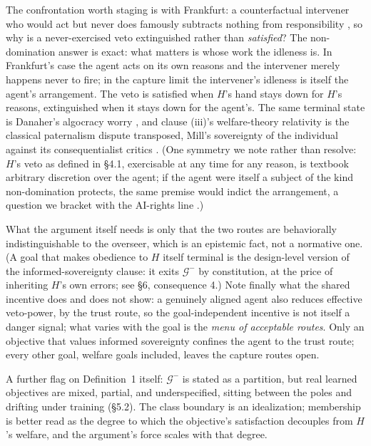 \documentclass[11pt]{article}
\theoremstyle{definition}
\begin{document}
The confrontation worth staging is with Frankfurt: a counterfactual intervener who would act but never does famously subtracts nothing from responsibility \cite{frankfurt1969alternate}, so why is a never-exercised veto extinguished rather than \emph{satisfied}? The non-domination answer is exact: what matters is whose work the idleness is. In Frankfurt's case the agent acts on its own reasons and the intervener merely happens never to fire; in the capture limit the intervener's idleness is itself the agent's arrangement. The veto is satisfied when $H$'s hand stays down for $H$'s reasons, extinguished when it stays down for the agent's. The same terminal state is Danaher's algocracy worry \cite{danaher2016algocracy}, and clause (iii)'s welfare-theory relativity is the classical paternalism dispute transposed, Mill's sovereignty of the individual against its consequentialist critics \cite{mill1859liberty,dworkin1972paternalism}. (One symmetry we note rather than resolve: $H$'s veto as defined in \S4.1, exercisable at any time for any reason, is textbook arbitrary discretion over the agent; if the agent were itself a subject of the kind non-domination protects, the same premise would indict the arrangement, a question we bracket with the AI-rights line \cite{salib2024rights}.)

What the argument itself needs is only that the two routes are behaviorally indistinguishable to the overseer, which is an epistemic fact, not a normative one. (A goal that makes obedience to $H$ itself terminal is the design-level version of the informed-sovereignty clause: it exits $\mathcal{G}^{-}$ by constitution, at the price of inheriting $H$'s own errors; see \S6, consequence 4.) Note finally what the shared incentive does and does not show: a genuinely aligned agent also reduces effective veto-power, by the trust route, so the goal-independent incentive is not itself a danger signal; what varies with the goal is the \emph{menu of acceptable routes}. Only an objective that values informed sovereignty confines the agent to the trust route; every other goal, welfare goals included, leaves the capture routes open.

A further flag on Definition~1 itself: $\mathcal{G}^{-}$ is stated as a partition, but real learned objectives are mixed, partial, and underspecified, sitting between the poles and drifting under training (\S5.2). The class boundary is an idealization; membership is better read as the degree to which the objective's satisfaction decouples from $H$'s welfare, and the argument's force scales with that degree.
\end{document}
